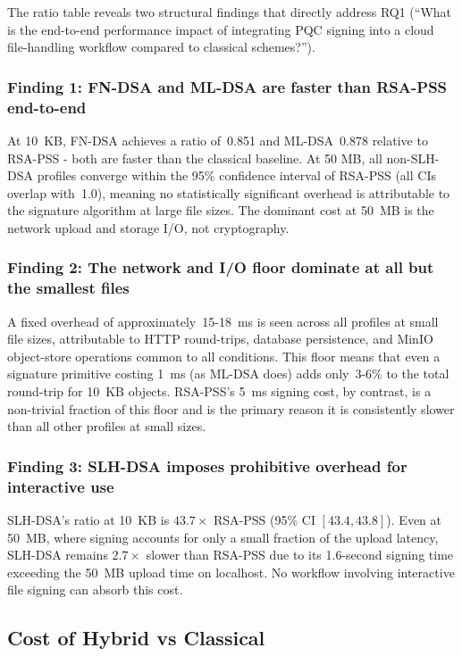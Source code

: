 \documentclass[12pt,a4paper]{article}
\begin{document}
The ratio table reveals two structural findings that directly address RQ1 (``What is the end-to-end performance impact of integrating PQC signing into a cloud file-handling workflow compared to classical schemes?'').

\subsubsection{Finding 1: FN-DSA and ML-DSA are faster than RSA-PSS end-to-end}
At 10~KB, FN-DSA achieves a ratio of~0.851 and ML-DSA~0.878 relative to RSA-PSS - both are faster than the classical baseline. At 50 MB, all non-SLH-DSA profiles converge within the 95\% confidence interval of RSA-PSS (all CIs overlap with~1.0), meaning no statistically significant overhead is attributable to the signature algorithm at large file sizes. The dominant cost at 50~MB is the network upload and storage I/O, not cryptography.

\subsubsection{Finding 2: The network and I/O floor dominate at all but the smallest files}
A fixed overhead of approximately~15-18~ms is seen across all profiles at small file sizes, attributable to HTTP round-trips, database persistence, and MinIO object-store operations common to all conditions. This floor means that even a signature primitive costing 1~ms (as ML-DSA does) adds only~3-6\% to the total round-trip for 10~KB objects. RSA-PSS's 5~ms signing cost, by contrast, is a non-trivial fraction of this floor and is the primary reason it is consistently slower than all other profiles at small sizes.

\subsubsection{Finding 3: SLH-DSA imposes prohibitive overhead for interactive use}
SLH-DSA's ratio at 10~KB is $43.7\times$ RSA-PSS (95\% CI $[43.4, 43.8]$). Even at 50~MB, where signing accounts for only a small fraction of the upload latency, SLH-DSA remains $2.7\times$ slower than RSA-PSS due to its 1.6-second signing time exceeding the 50~MB upload time on localhost. No workflow involving interactive file signing can absorb this cost.



\subsection{Cost of Hybrid vs Classical}
\label{sec:results:cost_vs_classical}
\end{document}
